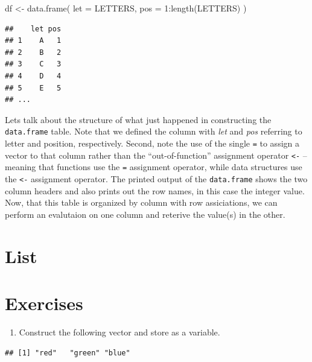 \documentclass[
]{book}
\newenvironment{Shaded}{\begin{snugshade}}{\end{snugshade}}
\newcommand{\AttributeTok}[1]{\textcolor[rgb]{0.77,0.63,0.00}{#1}}
\newcommand{\DecValTok}[1]{\textcolor[rgb]{0.00,0.00,0.81}{#1}}
\newcommand{\FunctionTok}[1]{\textcolor[rgb]{0.00,0.00,0.00}{#1}}
\newcommand{\NormalTok}[1]{#1}
\newcommand{\OtherTok}[1]{\textcolor[rgb]{0.56,0.35,0.01}{#1}}
\newcommand{\SpecialCharTok}[1]{\textcolor[rgb]{0.00,0.00,0.00}{#1}}
\providecommand{\tightlist}{%
  \setlength{\itemsep}{0pt}\setlength{\parskip}{0pt}}
\begin{document}
\begin{Shaded}
\begin{Highlighting}[]
\NormalTok{df }\OtherTok{\textless{}{-}} \FunctionTok{data.frame}\NormalTok{(}
  \AttributeTok{let =}\NormalTok{ LETTERS,}
  \AttributeTok{pos =} \DecValTok{1}\SpecialCharTok{:}\FunctionTok{length}\NormalTok{(LETTERS)}
\NormalTok{)}
\end{Highlighting}
\end{Shaded}

\begin{verbatim}
##    let pos
## 1    A   1
## 2    B   2
## 3    C   3
## 4    D   4
## 5    E   5
## ...
\end{verbatim}

Lets talk about the structure of what just happened in constructing the \texttt{data.frame} table. Note that we defined the column with \emph{let} and \emph{pos} referring to letter and position, respectively. Second, note the use of the single \texttt{=} to assign a vector to that column rather than the ``out-of-function'' assignment operator \texttt{\textless{}-} -- meaning that functions use the \texttt{=} assignment operator, while data structures use the \texttt{\textless{}-} assignment operator.
The printed output of the \texttt{data.frame} shows the two column headers and also prints out the row names, in this case the integer value. Now, that this table is organized by column with row assiciations, we can perform an evalutaion on one column and reterive the value(s) in the other.

\hypertarget{list}{%
\section{List}\label{list}}

\hypertarget{exercises-1}{%
\section*{Exercises}\label{exercises-1}}

\begin{enumerate}
\def\labelenumi{\arabic{enumi}.}
\tightlist
\item
  Construct the following vector and store as a variable.
\end{enumerate}

\begin{verbatim}
## [1] "red"   "green" "blue"
\end{verbatim}
\end{document}
